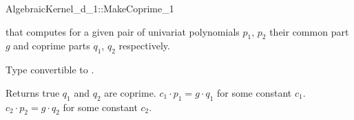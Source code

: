 \begin{ccRefConcept}{AlgebraicKernel_d_1::MakeCoprime_1}

\ccDefinition

 that computes for a given pair of 
univariat polynomials $p_1$, $p_2$ their common part $g$ and 
coprime parts $q_1$, $q_2$ respectively.



        { Type convertible to .}
 

{ Returns true $q_1$ and $q_2$ are coprime. 
\ccPostcond $c_1 \cdot p_1 =  g \cdot q_1$ for some constant $c_1$.
\ccPostcond $c_2 \cdot p_2 =  g \cdot q_2$ for some constant $c_2$.
}

\ccSeeAlso

\end{ccRefConcept}
